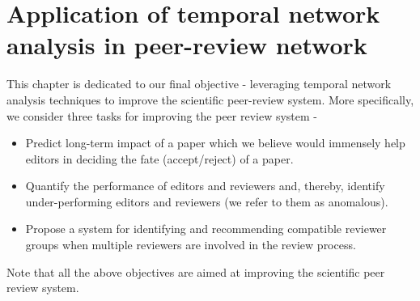 \documentclass[twoside,phd]{iitkgp}
\begin{document}
\sloppy

 \frontmatter


\makepreliminarypages

 \singlespace

 \tableofcontents
 \clearemptydoublepage

% 

 \listoffigures
 \clearemptydoublepage

 \listoftables
 \clearemptydoublepage




\onehalfspace


\mainmatter
\addtolength{\parskip}{0.7\baselineskip}

\abovedisplayskip=13pt
\belowdisplayskip=13pt
\setcounter{secnumdepth}{3}
\setcounter{tocdepth}{3}
%







\clearpage
\clearpage

\clearpage
\clearpage




\clearpage
\clearpage

\chapter{Application of temporal network analysis in peer-review network}

This chapter is dedicated to our final objective - leveraging temporal network analysis techniques to improve the scientific peer-review system. More specifically, 
we consider three tasks for improving the peer review system - 
\begin{itemize}
 \item Predict long-term impact of a paper which we believe would immensely help editors in deciding the fate (accept/reject) of a paper.
 \item Quantify the performance of editors and reviewers and, thereby, identify under-performing editors and reviewers (we refer to them as anomalous).
 \item Propose a system for identifying and recommending compatible reviewer groups when multiple reviewers are involved in the review process.
\end{itemize}
Note that all the above objectives are aimed at improving the scientific peer review system.
\end{document}

